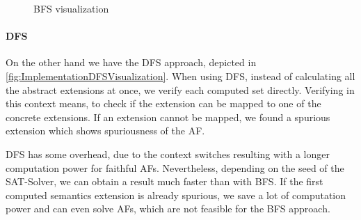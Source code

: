 \begin{figure}[h!]
    \centering
    \caption{BFS visualization}
    \label{fig:ImplementationBFSVisualization}
\end{figure}


\paragraph{DFS} On the other hand we have the DFS approach, depicted in \cref{fig:ImplementationDFSVisualization}. When using DFS, instead of calculating all the abstract extensions at once, we verify each computed set directly. Verifying in this context means, to check if the extension can be mapped to one of the concrete extensions. If an extension cannot be mapped, we found a spurious extension which shows spuriousness of the AF.

DFS has some overhead, due to the context switches resulting with a longer computation power for faithful AFs. Nevertheless, depending on the seed of the SAT-Solver, we can obtain a result much faster than with BFS. If the first computed semantics extension is already spurious, we save a lot of computation power and can even solve AFs, which are not feasible for the BFS approach.



